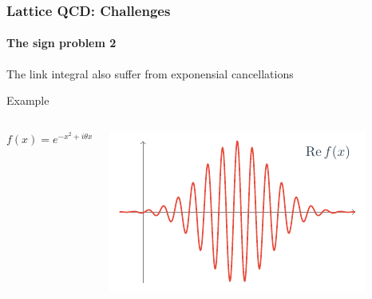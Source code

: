 \documentclass[12pt,a4paper,dvipsnames,usenames]{beamer}
\begin{document}
\begin{frame}
  \frametitle{Lattice QCD: Challenges}
  \framesubtitle{The sign problem 2}


  The link integral also suffer from exponensial cancellations

  \vspace{1em}

  Example

  \begin{columns}
    {\fontsize{10pt}{12pt} \raggedleft 
      \(
        f(x) = e^{\minus x^2 + i\theta x}
      \) \par
    }
    \begin{center}
      \includegraphics{Figs/plot.pdf}
    \end{center}
  \end{columns}





\end{frame}
\end{document}
